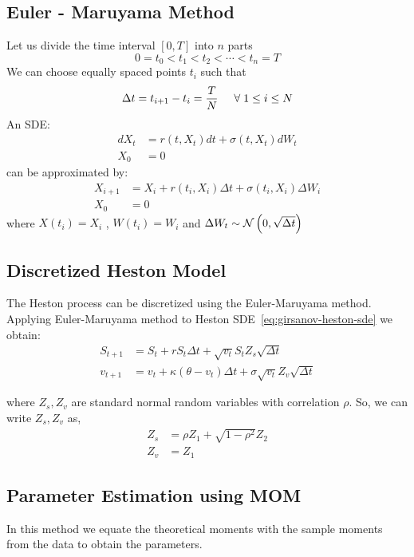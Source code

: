 \subsection{Euler - Maruyama Method}
Let us divide the time interval $[0,T]$ into $n$ parts
\begin{equation*}
	0 = t_0 < t_1 < t_2 < \cdots < t_n = T
\end{equation*}
We can choose equally spaced points $t_i$ such that
\begin{equation*}
	\Delta t = t_{i+1} - t_i = \frac{T}{N} \hspace{0.5cm}
	\forall \hspace{1mm}1\leq i \leq N
\end{equation*}
An SDE:
\begin{align*}
	dX_t &= r(t,X_t)dt + \sigma(t,X_t)dW_t \\
	X_0 &= 0
\end{align*}
can be approximated by:
\begin{align*}
	X_{i+1} &= X_i + r(t_i,X_i)\Delta t + \sigma(t_i,X_i)\Delta W_i \\
	X_0 &= 0
\end{align*}
where $X(t_i) = X_i$ , $W(t_i) = W_i$ and
$\Delta W_t \sim \mathcal{N} \left( 0,\sqrt{\Delta t} \right)$


\subsection{Discretized Heston Model}

The Heston process can be discretized using the Euler-Maruyama method.
Applying Euler-Maruyama method to Heston SDE~\ref{eq:girsanov-heston-sde}
we obtain:
\begin{align}
	S_{t+1} &= S_t + rS_t\Delta t + \sqrt{v_t}S_t Z_s\sqrt{\Delta t} \\
	v_{t+1} &= v_t + \kappa(\theta - v_t)\Delta t +
	\sigma \sqrt{v_t}Z_v\sqrt{\Delta t}
	\label{eq:discrete-heston}
\end{align}

where $Z_s,Z_v$ are standard normal random variables with correlation $\rho$.
So, we can write $Z_s,Z_v$ as,
\begin{align}
	Z_s &= \rho Z_1 + \sqrt{1-\rho^2}Z_2 \\
	Z_v &= Z_1
\end{align}


\subsection{Parameter Estimation using MOM}
In this method we equate the theoretical moments with the
sample moments from the data to obtain the parameters. \\

